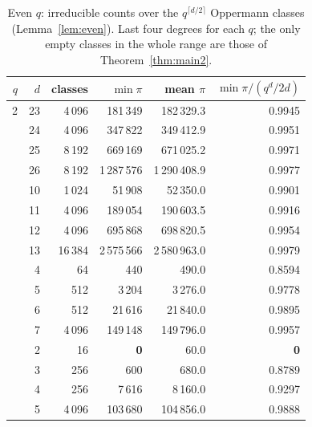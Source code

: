 \begin{table}[!htbp]
\centering
\caption{Even $q$: irreducible counts over the $q^{\lceil d/2\rceil}$ Oppermann classes (Lemma~\ref{lem:even}). Last four degrees for each $q$; the only empty classes in the whole range are those of Theorem~\ref{thm:main2}.}\label{tab:even}
\begin{tabular}{rrrrrr}
\toprule
$q$ & $d$ & classes & $\min\pi$ & mean $\pi$ & $\min\pi/(q^d/2d)$\\
\midrule
2 & 23 & 4\,096 & 181\,349 & 182\,329.3 & 0.9945\\
 & 24 & 4\,096 & 347\,822 & 349\,412.9 & 0.9951\\
 & 25 & 8\,192 & 669\,169 & 671\,025.2 & 0.9971\\
 & 26 & 8\,192 & 1\,287\,576 & 1\,290\,408.9 & 0.9977\\
\addlinespace
4 & 10 & 1\,024 & 51\,908 & 52\,350.0 & 0.9901\\
 & 11 & 4\,096 & 189\,054 & 190\,603.5 & 0.9916\\
 & 12 & 4\,096 & 695\,868 & 698\,820.5 & 0.9954\\
 & 13 & 16\,384 & 2\,575\,566 & 2\,580\,963.0 & 0.9979\\
\addlinespace
8 & 4 & 64 & 440 & 490.0 & 0.8594\\
 & 5 & 512 & 3\,204 & 3\,276.0 & 0.9778\\
 & 6 & 512 & 21\,616 & 21\,840.0 & 0.9895\\
 & 7 & 4\,096 & 149\,148 & 149\,796.0 & 0.9957\\
\addlinespace
16 & 2 & 16 & \textbf{0} & 60.0 & \textbf{0}\\
 & 3 & 256 & 600 & 680.0 & 0.8789\\
 & 4 & 256 & 7\,616 & 8\,160.0 & 0.9297\\
 & 5 & 4\,096 & 103\,680 & 104\,856.0 & 0.9888\\
\bottomrule
\end{tabular}
\end{table}

